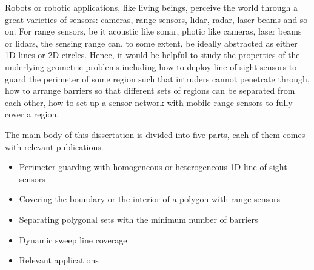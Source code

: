 \begin{my_abstract}

Robots or robotic applications, like living beings, perceive the world through
a great varieties of sensors: cameras, range sensors, lidar, radar, laser beams and so on.
For range sensors, be it acoustic like sonar, photic like cameras, laser beams or lidars, 
the sensing range can, to some extent, be ideally abstracted as either 1D lines or 2D circles.
Hence, it would be helpful to study the properties of the underlying geometric problems including 
how to deploy line-of-sight sensors to guard the perimeter of some region such that intruders cannot penetrate through, 
how to arrange barriers so that different sets of regions can be separated from each other,
how to set up a sensor network with mobile range sensors to fully cover a region. 

The main body of this dissertation is divided into five parts, each of them comes with relevant publications. 
\begin{itemize}
    \item Perimeter guarding with homogeneous or heterogeneous 1D line-of-sight sensors
    \item Covering the boundary or the interior of a polygon with range sensors
    \item Separating polygonal sets with the minimum number of barriers
    \item Dynamic sweep line coverage %
    \item Relevant applications
\end{itemize}

\end{my_abstract}
